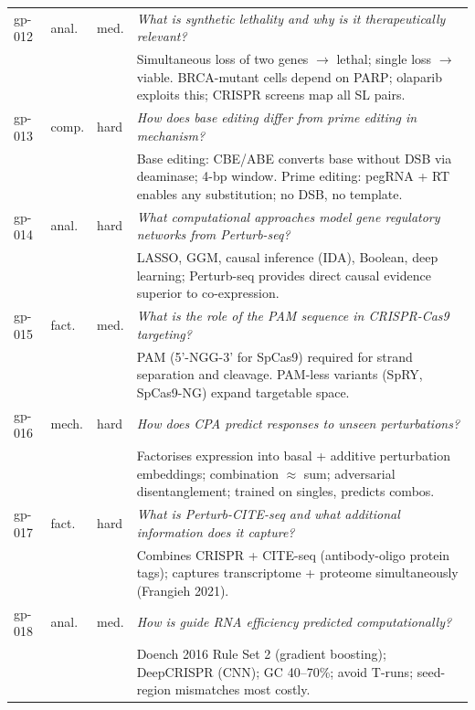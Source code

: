 \documentclass[12pt, a4paper]{article}
\begin{document}
\begin{longtable}{@{}llp{1.0cm}p{8.8cm}@{}}
gp-012 & anal. & med. &
  \textit{What is synthetic lethality and why is it therapeutically relevant?}\\
& & & \scriptsize Simultaneous loss of two genes $\to$ lethal; single loss $\to$ viable. BRCA-mutant cells depend on PARP; olaparib exploits this; CRISPR screens map all SL pairs. \\[2pt]

gp-013 & comp. & hard &
  \textit{How does base editing differ from prime editing in mechanism?}\\
& & & \scriptsize Base editing: CBE/ABE converts base without DSB via deaminase; 4-bp window. Prime editing: pegRNA + RT enables any substitution; no DSB, no template. \\[2pt]

gp-014 & anal. & hard &
  \textit{What computational approaches model gene regulatory networks from Perturb-seq?}\\
& & & \scriptsize LASSO, GGM, causal inference (IDA), Boolean, deep learning; Perturb-seq provides direct causal evidence superior to co-expression. \\[2pt]

gp-015 & fact. & med. &
  \textit{What is the role of the PAM sequence in CRISPR-Cas9 targeting?}\\
& & & \scriptsize PAM (5'-NGG-3' for SpCas9) required for strand separation and cleavage. PAM-less variants (SpRY, SpCas9-NG) expand targetable space. \\[2pt]

gp-016 & mech. & hard &
  \textit{How does CPA predict responses to unseen perturbations?}\\
& & & \scriptsize Factorises expression into basal + additive perturbation embeddings; combination $\approx$ sum; adversarial disentanglement; trained on singles, predicts combos. \\[2pt]

gp-017 & fact. & hard &
  \textit{What is Perturb-CITE-seq and what additional information does it capture?}\\
& & & \scriptsize Combines CRISPR + CITE-seq (antibody-oligo protein tags); captures transcriptome + proteome simultaneously (Frangieh 2021). \\[2pt]

gp-018 & anal. & med. &
  \textit{How is guide RNA efficiency predicted computationally?}\\
& & & \scriptsize Doench 2016 Rule Set 2 (gradient boosting); DeepCRISPR (CNN); GC 40--70\%; avoid T-runs; seed-region mismatches most costly. \\[2pt]


\end{longtable}
\end{document}
